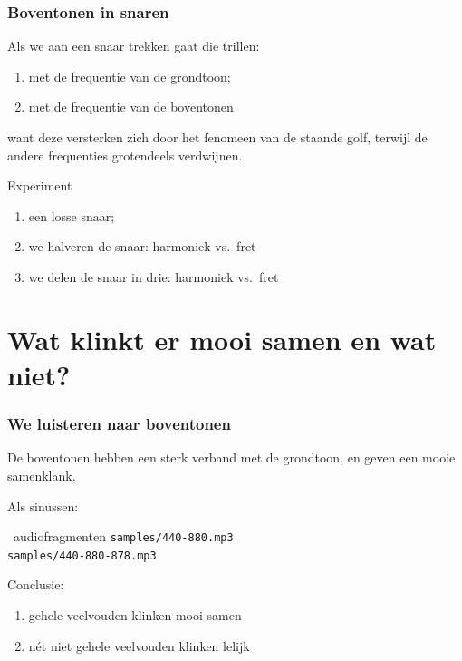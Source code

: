 \documentclass[compress, darktitle, framenumber, totalframenumber]{beamer}
\begin{document}
\begin{frame}
  \frametitle{Boventonen in snaren}

  Als we aan een snaar trekken gaat die trillen:
  \begin{enumerate}
    \item met de frequentie van de grondtoon;
    \item met de frequentie van de boventonen
  \end{enumerate}
  want deze versterken zich door het fenomeen van de staande golf, terwijl de andere frequenties grotendeels verdwijnen.
  \pause
  \begin{block}{Experiment}
    \begin{enumerate}
      \item een losse snaar;
        \pause
      \item we halveren de snaar: harmoniek vs.\ fret
        \pause
      \item we delen de snaar in drie: harmoniek vs.\ fret
    \end{enumerate}
  \end{block}
\end{frame}

\section{Wat klinkt er mooi samen en wat niet?}

\begin{frame}
  \frametitle{We luisteren naar boventonen}

  De boventonen hebben een sterk verband met de grondtoon, en geven een mooie samenklank.

  \pause

  Als sinussen:
  \begin{block}{\twonotes\ audiofragmenten}
    \texttt{samples/440-880.mp3} \\
    \texttt{samples/440-880-878.mp3} \\
  \end{block}

  \pause
  Conclusie:
  \begin{enumerate}
    \item gehele veelvouden klinken mooi samen
    \item n\'et niet gehele veelvouden klinken lelijk
  \end{enumerate}
\end{frame}
\end{document}
